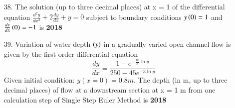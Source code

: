 \documentclass[journal]{IEEEtran}
\begin{document}
\begin{enumerate}
\begin{enumerate}[label=(\Alph*)]
    \end{enumerate}
    \item[38.] The solution (up to three decimal places) at x = 1 of the differential equation $\frac{d^2y}{dx^2}+2\frac{dy}{dx}+y=0$ subject to boundary conditions $y\left(0\right)=1$ and $\frac{dy}{dx}\left(0\right) = -1$ is \hfill \textbf{2018}
    \item[39.] Variation of water depth $\left(y\right)$ in a gradually varied open channel flow is given by the first
    order differential equation $$\frac{dy}{dx} = \frac{1-e^{-\frac{10}{3}\ln y}}{250-45e^{-3\ln y}}$$Given initial condition: $y(x = 0) = 0.8 m$. The depth (in m, up to three decimal places) of
    flow at a downstream section at x = 1 m from one calculation step of Single Step Euler Method is \hfill \textbf{2018}
     
\end{enumerate}
\end{document}
